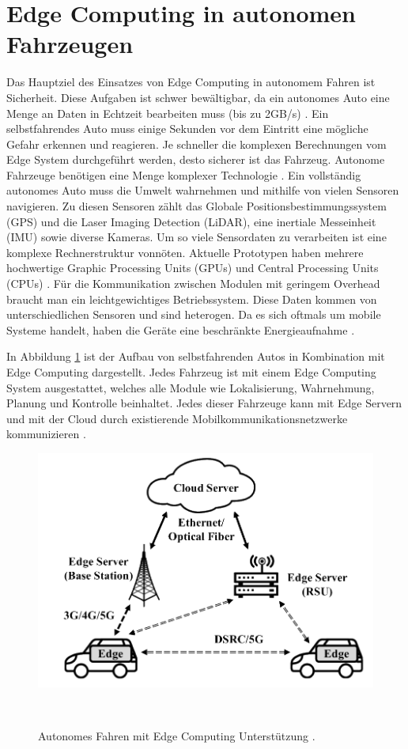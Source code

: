 \documentclass{sigchi}
\begin{document}
\section{Edge Computing in autonomen Fahrzeugen} \label{chap:edge-computing-autonomic-cars}
Das Hauptziel des Einsatzes von Edge Computing in autonomem Fahren ist Sicherheit. Diese Aufgaben ist schwer bewältigbar, da ein autonomes Auto eine Menge an Daten in Echtzeit bearbeiten muss (bis zu 2GB/s) \cite{architectures:2017}. Ein selbstfahrendes Auto muss einige Sekunden vor dem Eintritt eine mögliche Gefahr erkennen und reagieren. Je schneller die komplexen Berechnungen vom Edge System durchgeführt werden, desto sicherer ist das Fahrzeug. Autonome Fahrzeuge benötigen eine Menge komplexer Technologie \cite{opportunities-challenges:2019}.
Ein vollständig autonomes Auto muss die Umwelt wahrnehmen und mithilfe von vielen Sensoren navigieren. Zu diesen Sensoren zählt das Globale Positionsbestimmungssystem (GPS) und die Laser Imaging Detection (LiDAR), eine inertiale Messeinheit (IMU) sowie diverse Kameras. Um so viele Sensordaten zu verarbeiten ist eine komplexe Rechnerstruktur vonnöten. Aktuelle Prototypen haben mehrere hochwertige Graphic Processing Units (GPUs) und Central Processing Units (CPUs) \cite{architectures:2017}. Für die Kommunikation zwischen Modulen mit geringem Overhead braucht man ein leichtgewichtiges Betriebssystem. Diese Daten kommen von unterschiedlichen Sensoren und sind heterogen. Da es sich oftmals um mobile Systeme handelt, haben die Geräte eine beschränkte Energieaufnahme \cite{opportunities-challenges:2019}. 

In Abbildung \ref{fig:edge-computing-drive-infrastructure} ist der Aufbau von selbstfahrenden Autos in Kombination mit Edge Computing dargestellt. Jedes Fahrzeug ist mit einem Edge Computing System ausgestattet, welches alle Module wie Lokalisierung, Wahrnehmung, Planung und Kontrolle beinhaltet. Jedes dieser Fahrzeuge kann mit Edge Servern und mit der Cloud durch existierende Mobilkommunikationsnetzwerke kommunizieren \cite{opportunities-challenges:2019}.

\begin{figure}
\centering
  \includegraphics[width=0.70\columnwidth]{figures/edge-computing-drive-infrastructure.PNG}
  \caption{Autonomes Fahren mit Edge Computing Unterstützung \cite{opportunities-challenges:2019}.}~\label{fig:edge-computing-drive-infrastructure}
\end{figure}
\end{document}
